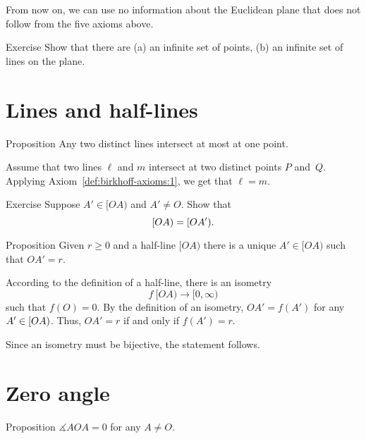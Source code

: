 From now on,  
we can use no information about the Euclidean plane that does not follow from the five axioms above.

\begin{thm}{Exercise}\label{ex:infinite}
Show that there are (a) an infinite set of points,
(b) an infinite set of lines on the plane.
\end{thm}

\section{Lines and half-lines}

\begin{thm}[\abs]{Proposition}\label{lem:line-line}
\let\thefootnote\relax{}
Any two distinct lines intersect at most at one point.
\end{thm}

Assume that two lines $\ell$ and $m$ intersect at two distinct points $P$ and~$Q$.
Applying Axiom~\ref{def:birkhoff-axioms:1}, we get that $\ell=m$.
\qeds

\begin{thm}{Exercise}\label{ex:[OA)=[OA')}
Suppose $A'\in[OA)$ and $A'\not=O$. 
Show that 
\[[O A)=[O A').\]

\end{thm}

\begin{thm}[\abs]{Proposition}\label{prop:point-on-half-line}
Given $r\ge 0$ and a half-line $[O A)$ there is a unique $A'\in [O A)$  such that $O A'=r$.
\end{thm}

According to the definition of a half-line, 
there is an isometry 
$$f\:[O A)\to [0,\infty)$$
such that $f(O)=0$.
By the definition of an isometry, $O A'=f(A')$ for any $A'\in [O A)$.
Thus, $O A'=r$ if and only if $f(A')=r$.

Since an isometry must be bijective, the statement follows.
\qeds

\section{Zero angle}

\begin{thm}[\abs]{Proposition}\label{lem:AOA=0}
$\measuredangle A O A= 0$ for any $A\not=O$.
\end{thm}


